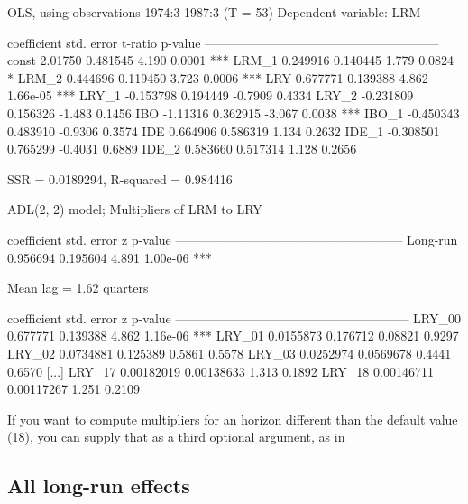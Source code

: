 \documentclass[a4paper,10pt]{article}
\begin{document}
\begin{scriptsize}
\begin{code}
OLS, using observations 1974:3-1987:3 (T = 53)
Dependent variable: LRM

             coefficient   std. error   t-ratio   p-value 
  --------------------------------------------------------
  const        2.01750      0.481545     4.190    0.0001   ***
  LRM_1        0.249916     0.140445     1.779    0.0824   *
  LRM_2        0.444696     0.119450     3.723    0.0006   ***
  LRY          0.677771     0.139388     4.862    1.66e-05 ***
  LRY_1       -0.153798     0.194449    -0.7909   0.4334  
  LRY_2       -0.231809     0.156326    -1.483    0.1456  
  IBO         -1.11316      0.362915    -3.067    0.0038   ***
  IBO_1       -0.450343     0.483910    -0.9306   0.3574  
  IDE          0.664906     0.586319     1.134    0.2632  
  IDE_1       -0.308501     0.765299    -0.4031   0.6889  
  IDE_2        0.583660     0.517314     1.128    0.2656  

SSR = 0.0189294, R-squared = 0.984416

ADL(2, 2) model;
Multipliers of LRM to LRY


             coefficient   std. error     z     p-value 
  ------------------------------------------------------
  Long-run    0.956694      0.195604    4.891   1.00e-06 ***

Mean lag =  1.62 quarters

             coefficient   std. error      z      p-value 
  --------------------------------------------------------
  LRY_00     0.677771      0.139388     4.862     1.16e-06 ***
  LRY_01     0.0155873     0.176712     0.08821   0.9297  
  LRY_02     0.0734881     0.125389     0.5861    0.5578  
  LRY_03     0.0252974     0.0569678    0.4441    0.6570
  [...]
  LRY_17     0.00182019    0.00138633   1.313     0.1892  
  LRY_18     0.00146711    0.00117267   1.251     0.2109  
\end{code}
\end{scriptsize}

If you want to compute multipliers for an horizon different than the
default value (18), you can supply that as a third optional argument, as in

\subsection{All long-run effects}
\label{sec:LR}
\end{document}
